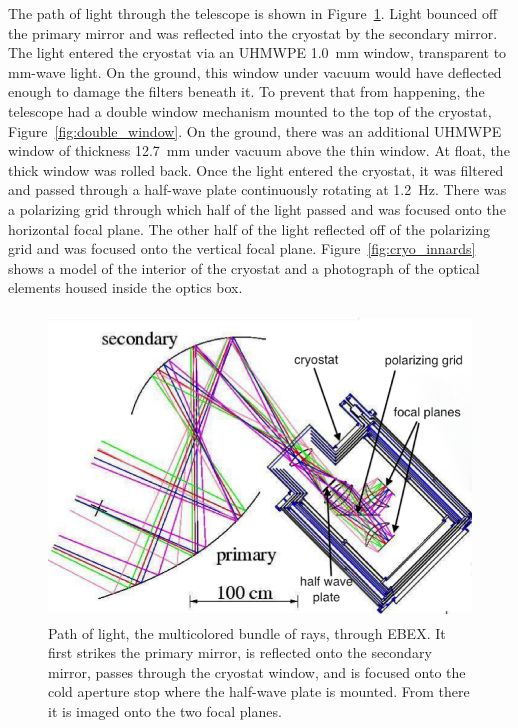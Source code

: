 The path of light through the telescope is shown in Figure~\ref{fig:optical_path}. 
Light bounced off the primary mirror and was reflected into the cryostat by the secondary mirror. 
The light entered the cryostat via an \ac{UHMWPE} 1.0~mm window, transparent to mm-wave light. 
On the ground, this window under vacuum would have deflected enough to damage the filters beneath it. 
To prevent that from happening, the telescope had a double window mechanism mounted to the top of the cryostat, Figure~\ref{fig:double_window}. 
On the ground, there was an additional \ac{UHMWPE} window of thickness 12.7~mm under vacuum above the thin window. 
At float, the thick window was rolled back. 
Once the light entered the cryostat, it was filtered and passed through a half-wave plate continuously rotating at 1.2~Hz. %
There was a polarizing grid through which half of the light passed and was focused onto the horizontal focal plane.
The other half of the light reflected off of the polarizing grid and was focused onto the vertical focal plane. 
Figure~\ref{fig:cryo_innards} shows a model of the interior of the cryostat and a photograph of the optical elements housed inside the optics box. 

\begin{figure}[htbp]
\begin{center}
\includegraphics[height=3.2in]{figures/ebex_optical_path.png}
\caption[EBEX optical path]{Path of light, the multicolored bundle of rays, through \ac{EBEX}. It first strikes the primary mirror, is reflected onto the secondary mirror, passes through the cryostat window, and is focused onto the cold aperture stop where the half-wave plate is mounted. From there it is imaged onto the two focal planes. 
\label{fig:optical_path} }
\end{center}
\end{figure}

